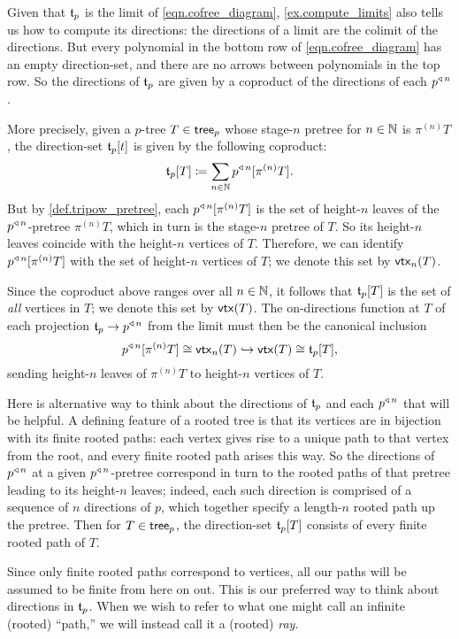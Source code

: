 \documentclass[Book-Poly]{subfiles}
\begin{document}
Given that $\mathfrak{t}_p$ is the limit of \eqref{eqn.cofree_diagram}, \cref{ex.compute_limits} also tells us how to compute its directions: the directions of a limit are the colimit of the directions.
But every polynomial in the bottom row of \eqref{eqn.cofree_diagram} has an empty direction-set, and there are no arrows between polynomials in the top row.
So the directions of $\mathfrak{t}_p$ are given by a coproduct of the directions of each $p^{\mathbin{\triangleleft}\,n}$.

More precisely, given a $p$-tree $T\in\mathsf{tree}_p$ whose stage-$n$ pretree for $n\in\mathbb{N}$ is $\pi^{(n)}T$, the direction-set $\mathfrak{t}_p[t]$ is given by the following coproduct:
\[
    \mathfrak{t}_p[T]\coloneqq\sum_{n\in\mathbb{N}}p^{\mathbin{\triangleleft}\,n}[\pi^{(n)}T].
\]
But by \cref{def.tripow_pretree}, each $p^{\mathbin{\triangleleft}\,n}[\pi^{(n)}T]$ is the set of height-$n$ leaves of the $p^{\mathbin{\triangleleft}\,n}$-pretree $\pi^{(n)}T$, which in turn is the stage-$n$ pretree of $T$.
So its height-$n$ leaves coincide with the height-$n$ vertices of $T$.
Therefore, we can identify $p^{\mathbin{\triangleleft}\,n}[\pi^{(n)}T]$ with the set of height-$n$ vertices of $T$; we denote this set by $\mathsf{vtx}_n(T)$.

Since the coproduct above ranges over all $n\in\mathbb{N}$, it follows that $\mathfrak{t}_p[T]$ is the set of \emph{all} vertices in $T$; we denote this set by $\mathsf{vtx}(T)$.
The on-directions function at $T$ of each projection $\mathfrak{t}_p\to p^{\mathbin{\triangleleft}\,n}$ from the limit must then be the canonical inclusion
\[
    p^{\mathbin{\triangleleft}\,n}[\pi^{(n)}T]\cong \mathsf{vtx}_n(T)\hookrightarrow \mathsf{vtx}(T)\cong\mathfrak{t}_p[T],
\]
sending height-$n$ leaves of $\pi^{(n)}T$ to height-$n$ vertices of $T$.

Here is alternative way to think about the directions of $\mathfrak{t}_p$ and each $p^{\mathbin{\triangleleft}\,n}$ that will be helpful.
A defining feature of a rooted tree is that its vertices are in bijection with its finite rooted paths: each vertex gives rise to a unique path to that vertex from the root, and every finite rooted path arises this way.
So the directions of $p^{\mathbin{\triangleleft}\,n}$ at a given $p^{\mathbin{\triangleleft}\,n}$-pretree correspond in turn to the rooted paths of that pretree leading to its height-$n$ leaves; indeed, each such direction is comprised of a sequence of $n$ directions of $p$, which together specify a length-$n$ rooted path up the pretree.
Then for $T\in\mathsf{tree}_p$, the direction-set $\mathfrak{t}_p[T]$ consists of every finite rooted path of $T$.

Since only finite rooted paths correspond to vertices, all our paths will be assumed to be finite from here on out. This is our preferred way to think about directions in $\mathfrak{t}_p$.
When we wish to refer to what one might call an infinite (rooted) ``path,'' we will instead call it a (rooted) \emph{ray}.
\end{document}
